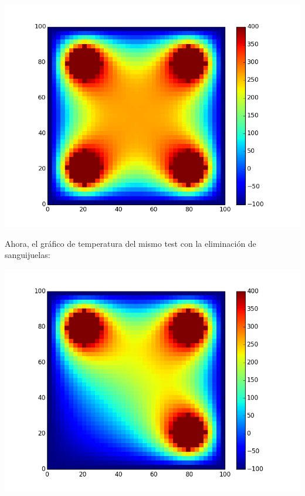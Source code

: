 	\begin{center}
		\includegraphics[scale=0.5]{./img/test3.png}
	\end{center}
	
	Ahora, el gráfico de temperatura del mismo test con la eliminación de sanguijuelas:
	
	\begin{center}
		\includegraphics[scale=0.5]{./img/test3_con_kil.png}
	\end{center}
	

